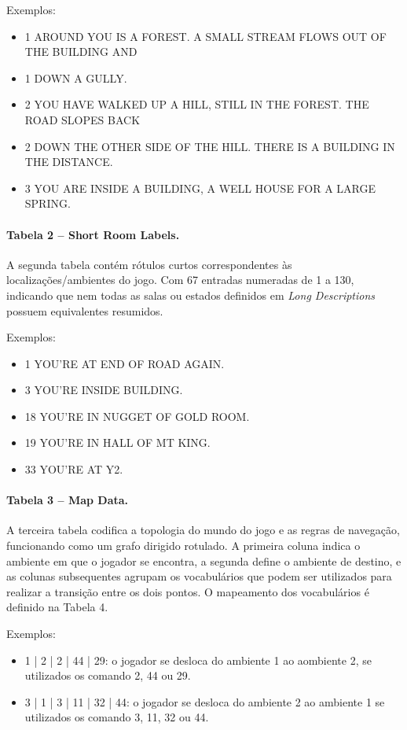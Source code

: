\documentclass[12pt,a4paper]{article}
\begin{document}
Exemplos:  
\begin{itemize}
    \item 1	AROUND YOU IS A FOREST.  A SMALL STREAM FLOWS OUT OF THE BUILDING AND
    \item 1	DOWN A GULLY.
    \item 2	YOU HAVE WALKED UP A HILL, STILL IN THE FOREST.  THE ROAD SLOPES BACK
    \item 2	DOWN THE OTHER SIDE OF THE HILL.  THERE IS A BUILDING IN THE DISTANCE.
    \item 3	YOU ARE INSIDE A BUILDING, A WELL HOUSE FOR A LARGE SPRING.
\end{itemize}

\paragraph{Tabela 2 – Short Room Labels.}  
A segunda tabela contém rótulos curtos correspondentes às localizações/ambientes do jogo. 
Com 67 entradas numeradas de 1 a 130, indicando que nem todas as salas ou estados definidos em \textit{Long Descriptions} possuem equivalentes resumidos.  

Exemplos:  
\begin{itemize}
    \item 1 YOU'RE AT END OF ROAD AGAIN.
    \item 3 YOU'RE INSIDE BUILDING.
    \item 18 YOU'RE IN NUGGET OF GOLD ROOM.
    \item 19 YOU'RE IN HALL OF MT KING.
    \item 33 YOU'RE AT Y2.
\end{itemize}


\paragraph{Tabela 3 – Map Data.}
A terceira tabela codifica a topologia do mundo do jogo e as regras de navegação, funcionando como um grafo dirigido rotulado. A primeira coluna indica o ambiente em que o jogador se encontra, a segunda define o ambiente de destino, e as colunas subsequentes agrupam os vocabulários que podem ser utilizados para realizar a transição entre os dois pontos. O mapeamento dos vocabulários é definido na Tabela 4.  

Exemplos:
\begin{itemize}
  \item 1 | 2 | 2 | 44 | 29: o jogador se desloca do ambiente 1 ao aombiente 2, se utilizados os comando 2, 44 ou 29. 
  \item 3 | 1 | 3 | 11 | 32 | 44: o jogador se desloca do ambiente 2 ao ambiente 1 se utilizados os comando 3, 11, 32 ou 44.
\end{itemize}
\end{document}
